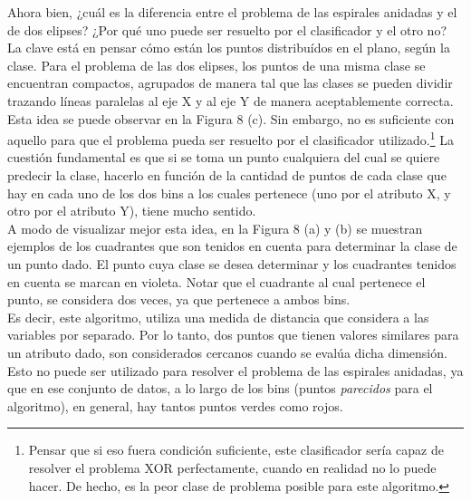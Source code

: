 \documentclass[12pt, a4paper]{article}
\begin{document}
Ahora bien, ¿cuál es la diferencia entre el problema de las espirales anidadas y el de dos elipses? ¿Por qué uno puede ser resuelto por el clasificador y el otro no? La clave está en pensar cómo están los puntos distribuídos en el plano, según la clase. Para el problema de las dos elipses, los puntos de una misma clase se encuentran compactos, agrupados de manera tal que las clases se pueden dividir trazando líneas paralelas al eje X y al eje Y de manera aceptablemente correcta. Esta idea se puede observar en la Figura 8 (c). Sin embargo, no es suficiente con aquello para que el problema pueda ser resuelto por el clasificador utilizado.\footnote{Pensar que si eso fuera condición suficiente, este clasificador sería capaz de resolver el problema XOR perfectamente, cuando en realidad no lo puede hacer. De hecho, es la peor clase de problema posible para este algoritmo.} La cuestión fundamental es que si se toma un punto cualquiera del cual se quiere predecir la clase, hacerlo en función de la cantidad de puntos de cada clase que hay en cada uno de los dos bins a los cuales pertenece (uno por el atributo X, y otro por el atributo Y), tiene mucho sentido.\\
A modo de visualizar mejor esta idea, en la Figura 8 (a) y (b) se muestran ejemplos de los cuadrantes que son tenidos en cuenta para determinar la clase de un punto dado. El punto cuya clase se desea determinar y los cuadrantes tenidos en cuenta se marcan en violeta. Notar que el cuadrante al cual pertenece el punto, se considera dos veces, ya que pertenece a ambos bins.\\
Es decir, este algoritmo, utiliza una medida de distancia que considera a las variables por separado. Por lo tanto, dos puntos que tienen valores similares para un atributo dado, son considerados cercanos cuando se evalúa dicha dimensión. Esto no puede ser utilizado para resolver el problema de las espirales anidadas, ya que en ese conjunto de datos, a lo largo de los bins (puntos \textit{parecidos} para el algoritmo), en general, hay tantos puntos verdes como rojos.
\end{document}
